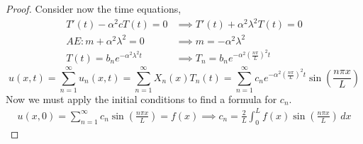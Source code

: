 \documentclass[oneside,11pt,pdftex,final]{book}%
\numberwithin{equation}{section}
\newtheorem{example}[theorem]{Example}
\numberwithin{section}{chapter}
\numberwithin{equation}{chapter}
\begin{document}
\begin{proof}
	Consider now the time equations,
	\begin{align*}
		T'(t)-\alpha^2cT(t)=0 &\implies T'(t)+\alpha^2\lambda^2T(t)=0\\
		AE: m+\alpha^2\lambda^2=0 &\implies m=-\alpha^2\lambda^2\\
		T(t)=b_ne^{-\alpha^2\lambda^2t}&\implies T_n=b_ne^{-\alpha^2\left(\frac{n \pi }{L}\right)^2 t}
	\end{align*}
	\[ u(x,t)=\sum_{n=1}^\infty u_n(x,t)=\sum_{n=1}^\infty X_n(x)T_n(t)=\sum_{n=1}^\infty c_n e^{-\alpha^2 \left(\frac{n \pi }{L}\right)^2 t} \sin\left(\frac{n \pi x}{L}\right)\]
	Now we must apply the initial conditions to find a formula for $ c_n $.
	\begin{align*}
		u(x,0)=\sum_{n=1}^\infty c_n \sin\left(\frac{n \pi x}{L}\right)=f(x) \implies c_n=\frac{2}{L}\int_0^L f(x) \sin \left( \frac{n \pi x}{L} \right) \, dx
	\end{align*}
\end{proof}

\end{document}

